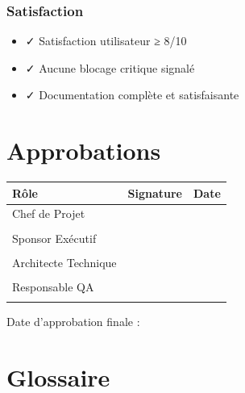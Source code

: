 \documentclass[12pt,a4paper,french]{report}
\begin{document}
\subsection{Satisfaction}

\begin{itemize}
    \item ✓ Satisfaction utilisateur ≥ 8/10
    \item ✓ Aucune blocage critique signalé
    \item ✓ Documentation complète et satisfaisante
\end{itemize}

\chapter*{Approbations}

\vspace{2cm}

\begin{table}[H]
\centering
\begin{tabularx}{\textwidth}{|l|l|l|}
\hline
\rowcolor{LightGray}
\textbf{Rôle} & \textbf{Signature} & \textbf{Date} \\
\hline
Chef de Projet & & \\
\hline
 & & \\
\hline
Sponsor Exécutif & & \\
\hline
 & & \\
\hline
Architecte Technique & & \\
\hline
 & & \\
\hline
Responsable QA & & \\
\hline
 & & \\
\hline
\end{tabularx}
\end{table}

\vspace{1cm}

\noindent Date d'approbation finale : \underline{\hspace{4cm}}

\appendix

\chapter{Glossaire}
\end{document}
